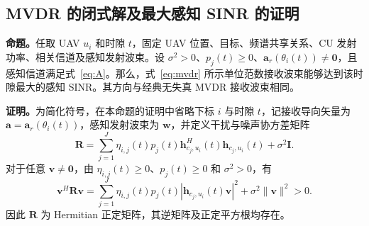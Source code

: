 \subsection{MVDR 的闭式解及最大感知 SINR 的证明}

\noindent\textbf{命题。}任取 UAV $u_i$ 和时隙 $t$，固定 UAV 位置、目标、频谱共享关系、CU 发射功率、相关信道及感知发射波束。设 $\sigma^2>0$、$p_j(t)\ge0$、$\bm a_r(\theta_i(t))\ne\bm0$，且感知信道满足式~\eqref{eq:A}。那么，式~\eqref{eq:mvdr} 所示单位范数接收波束能够达到该时隙最大的感知 SINR。其方向与经典无失真 MVDR 接收波束相同。

\medskip
\noindent\textbf{证明。}为简化符号，在本命题的证明中省略下标 $i$ 与时隙 $t$，记接收导向矢量为 $\bm a=\bm a_r(\theta_i(t))$，感知发射波束为 $\bm w$，并定义干扰与噪声协方差矩阵
\begin{equation}\label{eq:deriv-R}
\mathbf R=\sum_{j=1}^J\eta_{i,j}(t)p_j(t)
\bm h_{c_j,u_i}^{H}(t)\bm h_{c_j,u_i}(t)+\sigma^2\mathbf I.
\end{equation}
对于任意 $\bm v\ne\bm0$，由 $\eta_{i,j}(t)\ge0$、$p_j(t)\ge0$ 和 $\sigma^2>0$，有
\begin{equation}\label{eq:deriv-positive}
\bm v^H\mathbf R\bm v
=\sum_{j=1}^J\eta_{i,j}(t)p_j(t)
\left|\bm h_{c_j,u_i}(t)\bm v\right|^2+\sigma^2\|\bm v\|^2>0.
\end{equation}
因此 $\mathbf R$ 为 Hermitian 正定矩阵，其逆矩阵及正定平方根均存在。

